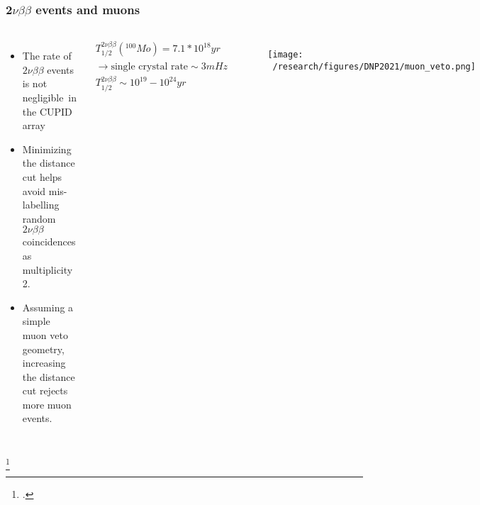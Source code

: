 \documentclass{beamer}
\begin{document}
	\begin{frame}
		\frametitle{2$\nu\beta\beta$ events and muons}
		\begin{columns}[c] %
			
			\begin{itemize}
				\setlength\itemsep{2em}				
				\item The rate of $2\nu\beta\beta$ events is not negligible\footnotemark \ in the CUPID array
				\item Minimizing the distance cut helps avoid mis-labelling random $2\nu\beta\beta$ coincidences as multiplicity 2.
				\item Assuming a simple muon veto geometry, increasing the distance cut rejects more muon events.
			\end{itemize}
			
			\begin{eqnarray*}
			T_{1/2}^{2\nu\beta\beta}(^{100}Mo) = 7.1* 10^{18} yr \\ 
			\rightarrow \text{single crystal rate} \sim 3mHz \\
			T_{1/2}^{2\nu\beta\beta} \sim 10^{19}-10^{24} yr
			\end{eqnarray*}			
			
			\begin{figure}
			\texttt{[image: ~/research/figures/DNP2021/muon\_veto.png]}
			\end{figure}
			
		\end{columns}
		\footcitetext{arxiv.org/abs/1912.07272}
	\end{frame}


\end{document}
